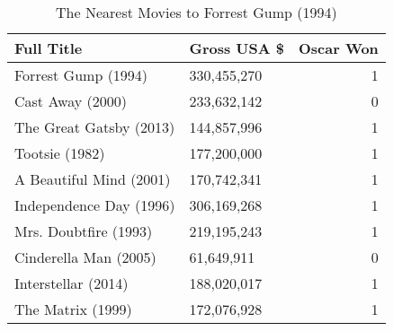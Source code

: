 \begin{table}[H]
\centering
\begin{tabular}{llr}
  \hline
Full Title & Gross USA \$ & Oscar Won \\ 
  \hline
Forrest Gump (1994) & 330,455,270 &   1 \\ 
  Cast Away (2000) & 233,632,142 &   0 \\ 
  The Great Gatsby (2013) & 144,857,996 &   1 \\ 
  Tootsie (1982) & 177,200,000 &   1 \\ 
  A Beautiful Mind (2001) & 170,742,341 &   1 \\ 
  Independence Day (1996) & 306,169,268 &   1 \\ 
  Mrs. Doubtfire (1993) & 219,195,243 &   1 \\ 
  Cinderella Man (2005) & 61,649,911 &   0 \\ 
  Interstellar (2014) & 188,020,017 &   1 \\ 
  The Matrix (1999) & 172,076,928 &   1 \\ 
   \hline
\end{tabular}
\caption{The Nearest Movies to Forrest Gump (1994)} 
\end{table}

